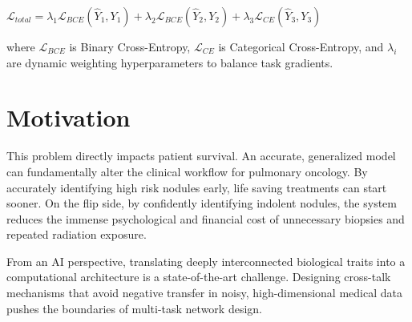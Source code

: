 $\mathcal{L}_{total} = \lambda_1 \mathcal{L}_{BCE}(\hat{Y}_1, Y_1) + \lambda_2 \mathcal{L}_{BCE}(\hat{Y}_2, Y_2) + \lambda_3 \mathcal{L}_{CE}(\hat{Y}_3, Y_3)$

where $\mathcal{L}_{BCE}$ is Binary Cross-Entropy, $\mathcal{L}_{CE}$ is Categorical Cross-Entropy, and $\lambda_i$ are dynamic weighting hyperparameters to balance task gradients.

\section{Motivation}
\label{section:motivation}
This problem directly impacts patient survival. An accurate, generalized model can fundamentally alter the clinical workflow for pulmonary oncology. By accurately identifying high risk nodules early, life saving treatments can start sooner. On the flip side, by confidently identifying indolent nodules, the system reduces the immense psychological and financial cost of unnecessary biopsies and repeated radiation exposure.

From an AI perspective, translating deeply interconnected biological traits into a computational architecture is a state-of-the-art challenge. Designing cross-talk mechanisms that avoid negative transfer in noisy, high-dimensional medical data pushes the boundaries of multi-task network design.